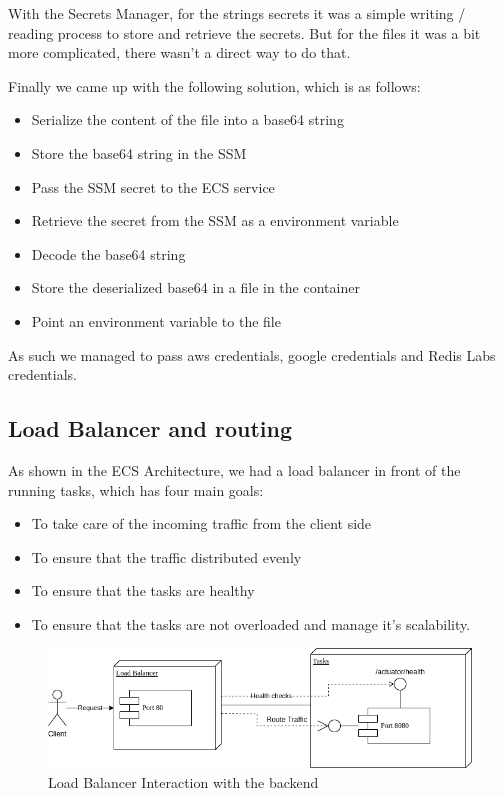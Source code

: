 With the Secrets Manager, for the strings secrets it was a simple writing / reading process
to store and retrieve the secrets. But for the files it was a bit more complicated, there
wasn't a direct way to do that.

Finally we came up with the following solution, which is as follows:

\begin{itemize}
    \item Serialize the content of the file into a base64 string
    \item Store the base64 string in the SSM
    \item Pass the SSM secret to the ECS service
    \item Retrieve the secret from the SSM as a environment variable
    \item Decode the base64 string
    \item Store the deserialized base64 in a file in the container
    \item Point an environment variable to the file
\end{itemize}

As such we managed to pass aws credentials, google credentials and Redis Labs credentials.

\subsection {Load Balancer and routing}

As shown in the ECS Architecture, we had a load balancer in front of the running tasks, which has four main goals:

\begin{itemize}
    \item To take care of the incoming traffic from the client side
    \item To ensure that the traffic distributed evenly
    \item To ensure that the tasks are healthy
    \item To ensure that the tasks are not overloaded and manage it's scalability.
\end{itemize}

\begin{figure}[!htbp]
    \centering
    \includegraphics[width=\textwidth]{images/loadBalancer.png}
    \caption{\footnotesize{Load Balancer Interaction with the backend}}
    \label{fig:loadbalancer}
\end{figure}

